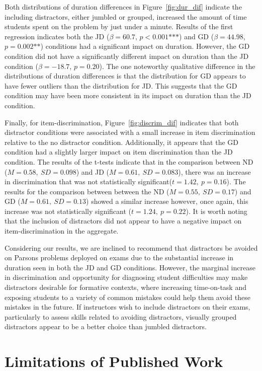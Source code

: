 \documentclass[authorversion,nonacm]{acmart}
\begin{document}
Both distributions of duration differences in Figure~\ref{fig:dur_dif} indicate
the including distractors, either jumbled or grouped, increased the amount of
time students spent on the problem by just under a minute. Results of the first
regression indicates both the JD ($\beta = 60.7$, $p<0.001\text{***}$) and GD ($\beta
= 44.98$, $p = 0.002\text{**}$) conditions had a significant impact on duration.
However, the GD condition did not have a significantly different impact on
duration than the JD condition ($\beta = -18.7$, $p = 0.20$). The one
noteworthy qualitative difference in the distributions of duration differences
is that the distribution for GD appears to have fewer outliers than the
distribution for JD. This suggests that the GD condition may have been more
consistent in its impact on duration than the JD condition.


Finally, for item-discrimination, Figure~\ref{fig:discrim_dif} indicates that
both distractor conditions were associated with a small increase in item
discrimination relative to the no distractor condition. Additionally, it
appears that the GD condition had a slightly larger impact on item
discrimination than the JD condition.  The results of the t-tests indicate that
in the comparison between ND ($M=0.58,\ SD=0.098$) and JD ($M=0.61,\ SD=0.083$),
there was an increase in discrimination that was not statistically
significant($t=1.42,\ p=0.16$).  The results for the comparison between between
the ND ($M=0.55,\ SD=0.17$) and GD ($M=0.61,\ SD=0.13$) showed a similar increase
however, once again, this increase was not statistically significant ($t=1.24,\
p=0.22$). It is worth noting that the inclusion of distractors did not appear to
have a negative impact on item-discrimination in the aggregate. 

Considering our results, we are inclined to recommend that distractors be
avoided on Parsons problems deployed on exams due to the substantial increase
in duration seen in both the JD and GD conditions. However, the marginal
increase in discrimination and opportunity for diagnosing student difficulties
may make distractors desirable for formative contexts, where increasing
time-on-task and exposing students to a variety of common mistakes could help
them avoid these mistakes in the future. If instructors wish to include
distractors on their exams, particularly to assess skills related to avoiding
distractors, visually grouped distractors appear to be a better choice than
jumbled distractors.


\section{Limitations of Published Work}
\end{document}

